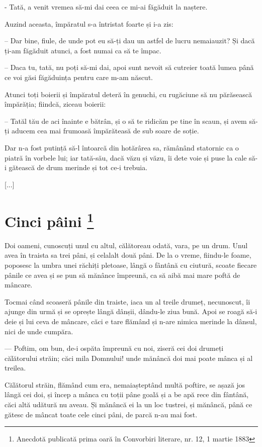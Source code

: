 \documentclass[12pt, a4paper, oneside, romanian]{teza-upb}
\begin{document}
- Tată, a venit vremea să-mi dai ceea ce mi-ai făgăduit la naștere.

Auzind aceasta, împăratul s-a întristat foarte și i-a zis:

– Dar bine, fiule, de unde pot eu să-ți dau un astfel de lucru nemaiauzit? Și dacă ți-am făgăduit atunci, a fost numai ca să te împac.

– Daca tu, tată, nu poți să-mi dai, apoi sunt nevoit să cutreier toată lumea până ce voi găsi făgăduința pentru care m-am născut.

Atunci toți boierii și împăratul deteră în genuchi, cu rugăciune să nu părăsească împărăția; fiindcă, ziceau boierii:

– Tatăl tău de aci înainte e bătrân, și o să te ridicăm pe tine în scaun, și avem să-ți aducem cea mai frumoasă împărăteasă de sub soare de soție.

Dar n-a fost putință să-l întoarcă din hotărârea sa, rămânând statornic ca o piatră în vorbele lui; iar tată-său, dacă văzu și văzu, îi dete voie și puse la cale să-i gătească de drum merinde și tot ce-i trebuia.


[...]

\section[Cinci Pâini]{Cinci pâini \footnote{Anecdotă publicată prima oară în Convorbiri literare, nr. 12, 1 martie 1883}}


Doi oameni, cunoscuți unul cu altul, călătoreau odată, vara, pe un drum. Unul avea în traista sa trei pâni, și celalalt două pâni. De la o vreme, fiindu-le foame, poposesc la umbra unei răchiți pletoase, lângă o fântână cu ciutură, scoate fiecare pânile ce avea și se pun să mănânce împreună, ca să aibă mai mare poftă de mâncare.


Tocmai când scoaseră pânile din traiste, iaca un al treile drumeț, necunoscut, îi ajunge din urmă și se oprește lângă dânșii, dându-le ziua bună. Apoi se roagă să-i deie și lui ceva de mâncare, căci e tare flămând și n-are nimica merinde la dânsul, nici de unde cumpăra.

— Poftim, om bun, de-i ospăta împreună cu noi, ziseră cei doi drumeți călătorului străin; căci mila Domnului! unde mănâncă doi mai poate mânca și al treilea.

Călătorul străin, flămând cum era, nemaiașteptând multă poftire, se așază jos lângă cei doi, și încep a mânca cu toții pâne goală și a be apă rece din fântână, căci altă udătură nu aveau. Și mănâncă ei la un loc tustrei, și mănâncă, până ce gătesc de mâncat toate cele cinci pâni, de parcă n-au mai fost.
\end{document}
